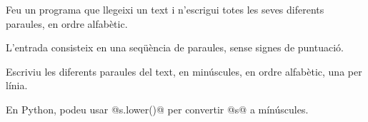 

\Statement

Feu un programa que llegeixi un text i n'escrigui totes les seves diferents paraules, en ordre alfabètic.

\Input

L'entrada consisteix en una seqüència de paraules, sense signes de puntuació.

\Output

Escriviu les diferents paraules del text, en minúscules, en ordre alfabètic, una per línia.

\Observation

En Python, podeu usar @s.lower()@ per convertir @s@ a mínúscules.

\Sample

